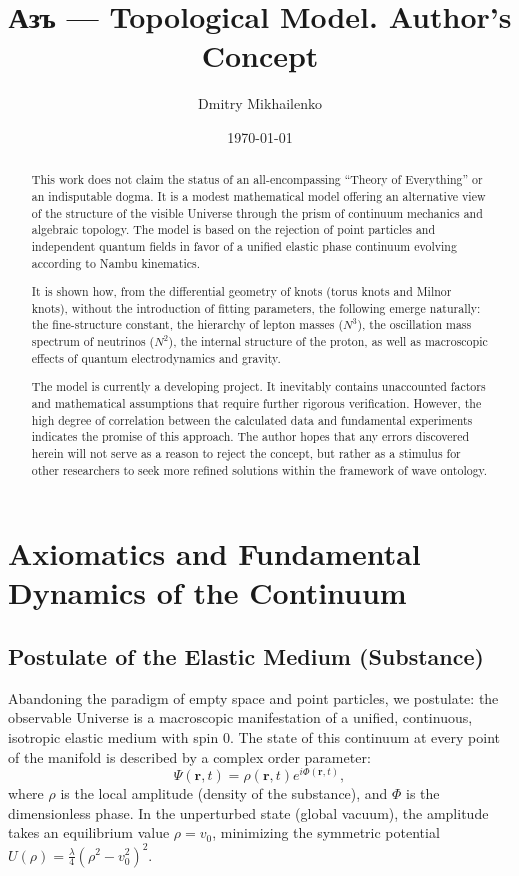 \documentclass[12pt,a4paper]{article}
\title{Азъ — Topological Model. Author's Concept}
\author{Dmitry Mikhailenko}
\date{\today}
\begin{document}
	
\maketitle

\begin{abstract}
	This work does not claim the status of an all-encompassing ``Theory of Everything'' or an indisputable dogma. It is a modest mathematical model offering an alternative view of the structure of the visible Universe through the prism of continuum mechanics and algebraic topology. The model is based on the rejection of point particles and independent quantum fields in favor of a unified elastic phase continuum evolving according to Nambu kinematics. 
	
	It is shown how, from the differential geometry of knots (torus knots and Milnor knots), without the introduction of fitting parameters, the following emerge naturally: the fine-structure constant, the hierarchy of lepton masses ($N^3$), the oscillation mass spectrum of neutrinos ($N^2$), the internal structure of the proton, as well as macroscopic effects of quantum electrodynamics and gravity.
	
	The model is currently a developing project. It inevitably contains unaccounted factors and mathematical assumptions that require further rigorous verification. However, the high degree of correlation between the calculated data and fundamental experiments indicates the promise of this approach. The author hopes that any errors discovered herein will not serve as a reason to reject the concept, but rather as a stimulus for other researchers to seek more refined solutions within the framework of wave ontology.
\end{abstract}

\section{Axiomatics and Fundamental Dynamics of the Continuum}

\subsection{Postulate of the Elastic Medium (Substance)}
Abandoning the paradigm of empty space and point particles, we postulate: the observable Universe is a macroscopic manifestation of a unified, continuous, isotropic elastic medium with spin 0. The state of this continuum at every point of the manifold is described by a complex order parameter:
\begin{equation}
	\Psi(\mathbf{r}, t) = \rho(\mathbf{r}, t) e^{i\Phi(\mathbf{r}, t)},
\end{equation}
where $\rho$ is the local amplitude (density of the substance), and $\Phi$ is the dimensionless phase. In the unperturbed state (global vacuum), the amplitude takes an equilibrium value $\rho = v_0$, minimizing the symmetric potential $U(\rho) = \frac{\lambda}{4}(\rho^2 - v_0^2)^2$.
\end{document}
